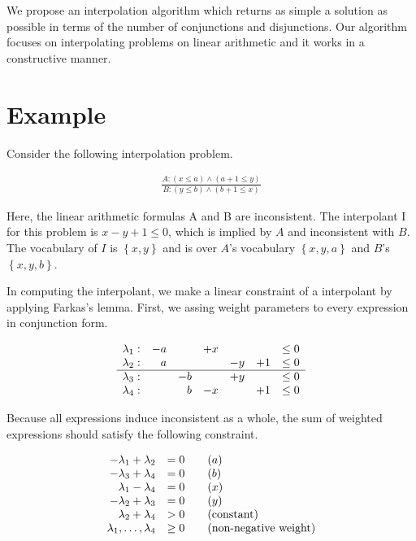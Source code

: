 \documentclass[master,final,12pt]{iscs-thesis}
\begin{document}
We propose an interpolation algorithm which returns as simple a
solution as possible in terms of the number of conjunctions and
disjunctions.  Our algorithm focuses on interpolating problems on
linear arithmetic and it works in a constructive manner.


\section{Example}

Consider the following interpolation problem.

\begin{align*}
\frac
{A: (x \leq a) \wedge (a + 1 \leq y)}
{B: (y \leq b) \wedge (b + 1 \leq x)}
\end{align*}

Here, the linear arithmetic formulas A and B are inconsistent.  The
interpolant I for this problem is $x-y+1 \leq 0$, which is implied by
$A$ and inconsistent with $B$.  The vocabulary of $I$ is $\left\lbrace
x,y \right\rbrace$ and is over $A$'s vocabulary $\left\lbrace x,y,a
\right\rbrace$ and $B$'s $\left\lbrace x,y,b \right\rbrace$.

In computing the interpolant, we make a linear constraint of a
interpolant by applying Farkas's lemma.  First, we assing weight
parameters to every expression in conjunction form.

\begin{align*}
\begin{array}{r r r r r r l}
\lambda_1 : & -a & & +x & & & \leq 0 \\
\lambda_2 : & a & & & -y & +1 & \leq 0 \\
\hline
\lambda_3 : & & -b & & +y & & \leq 0 \\
\lambda_4 : & & b & -x & & +1 & \leq 0
\end{array}
\end{align*}

Because all expressions induce inconsistent as a whole, the sum of
weighted expressions should satisfy the following constraint.

\begin{align*}
\begin{array}{r l l}
- \lambda_1 + \lambda_2 & = 0 \quad & (a) \\
- \lambda_3 + \lambda_4 & = 0 & (b) \\
  \lambda_1 - \lambda_4 & = 0 & (x) \\
- \lambda_2 + \lambda_3 & = 0 & (y) \\
  \lambda_2 + \lambda_4 & > 0 & (\text{constant}) \\
\lambda_1, \ldots, \lambda_4 & \geq 0 & (\text{non-negative weight})
\end{array}
\end{align*}
\end{document}
